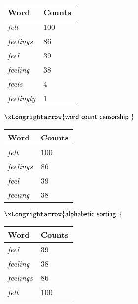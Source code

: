 \documentclass[10pt,journal,compsoc]{IEEEtran}
\begin{document}
\begin{figure*}[t]

\begin{minipage}{1\textwidth}\begin{center}
\begin{minipage}{.14\textwidth}
\begin{scriptsize}\begin{tabular}{l|l}Word&Counts\\\hline
\textit{felt}&100\\
\textit{feelings}&86\\
\textit{feel}&39\\
\textit{feeling}&38\\
\textit{feels}&4\\
\textit{feelingly}&1
\end{tabular}\end{scriptsize}\end{minipage}$\xLongrightarrow{\text{\textsf{word count censorship} }}$\begin{minipage}{.14\textwidth}
\begin{scriptsize}\begin{tabular}{l|l}Word&Counts\\\hline
\textit{felt}&100\\
\textit{feelings}&86\\
\textit{feel}&39\\
\textit{feeling}&38\\
\end{tabular}\end{scriptsize}\end{minipage}$\xLongrightarrow{\text{\textsf{alphabetic sorting} }}$\begin{minipage}{.18\textwidth}
\begin{scriptsize}\begin{tabular}{l|l}Word&Counts\\\hline
\textit{feel}&39\\
\textit{feeling}&38\\
\textit{feelings}&86\\
\textit{felt}&100\\
\end{tabular}\end{scriptsize}\end{minipage}


\end{center}
\end{minipage}
\end{figure*}
\end{document}
